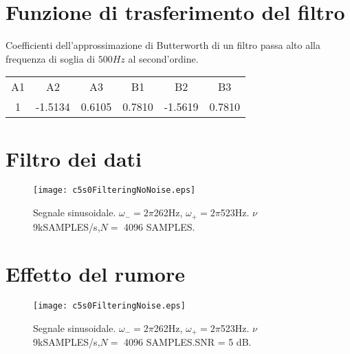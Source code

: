 \section{Funzione di trasferimento del filtro}
\label{section trasferimento}

Coefficienti dell'approssimazione di Butterworth di un filtro passa alto alla frequenza di soglia di $500Hz$ al second'ordine. 

\begin{center}
\begin{tabular}[c]{cccccc}
A1 & A2 & A3 & B1 & B2 & B3\\
1 & -1.5134 & 0.6105 & 0.7810 & -1.5619 & 0.7810
\end{tabular}
\end{center}
\label{tab: parametri}


\pagebreak


\section{Filtro dei dati}
\label{section filtro}


\begin{figure}%
\centering    
\texttt{[image: c5s0FilteringNoNoise.eps]}
\caption[Densità spettrale di potenza senza rumore]
{Segnale sinusoidale. $\omega_{-}=2\pi$262Hz, $\omega_{+}=2\pi$523Hz. $
\nu$ 9kSAMPLES/s,$N=$ 4096 SAMPLES.}
\label{fig:c5s0FilteringNoNoise}
\end{figure}


\newpage




\section{Effetto del rumore}
\label{sez:FiltroRumore}


\begin{figure}%
\centering    
\texttt{[image: c5s0FilteringNoise.eps]}
\caption[Densità spettrale di potenza con rumore]
{Segnale sinusoidale. $\omega_{-}=2\pi$262Hz, $\omega_{+}=2\pi$523Hz. $
\nu$ 9kSAMPLES/s,$N=$ 4096 SAMPLES.SNR = 5 dB.}
\label{fig:c5s0FilteringNoise}
\end{figure}

\newpage



